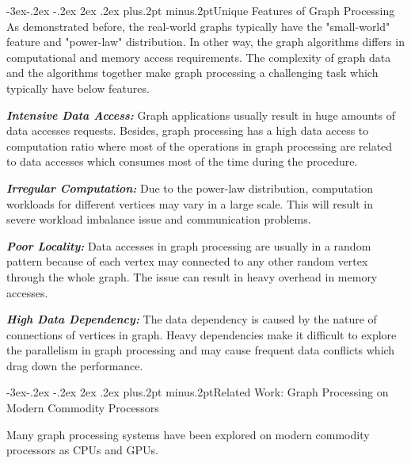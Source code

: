 \documentclass[twoside]{article}
\makeatletter
\def\subsection{\@startsection{subsection}{2}{\z@}%
 {-3ex\@plus -.2ex \@minus -.2ex}%
 {2ex \@plus.2ex}%
{\normalfont\normalsize\protect\baselineskip=12.5pt plus.2pt minus.2pt\bfseries}}
\makeatother
\begin{document}
\begin{multicols}{2}
\subsection{Unique Features of Graph Processing}
As demonstrated before, the real-world graphs typically have the "small-world" feature and "power-law" distribution. In other way, the graph algorithms differs in computational and memory access requirements. The complexity of graph data and the algorithms together make graph processing a challenging task which typically have below features.

\emph{\bf Intensive Data Access:} Graph applications usually result in huge amounts of data accesses requests. Besides, graph processing has a high data access to computation ratio where most of the operations in graph processing are related to data accesses which consumes most of the time during the procedure.

\emph{\bf Irregular Computation:} Due to the power-law distribution, computation workloads for different vertices may vary in a large scale. This will result in severe workload imbalance issue and communication problems.

\emph{\bf Poor Locality:} Data accesses in graph processing are usually in a random pattern because of each vertex may connected to any other random vertex through the whole graph. The issue can result in heavy overhead in memory accesses.

\emph{\bf High Data Dependency:} The data dependency is caused by the nature of connections of vertices in graph. Heavy dependencies make it difficult to explore the parallelism in graph processing and may cause frequent data conflicts which drag down the performance.

\subsection{Related Work: Graph Processing on Modern Commodity Processors}

Many graph processing systems have been explored on modern commodity processors as CPUs and GPUs.


\end{multicols}
\end{document}
